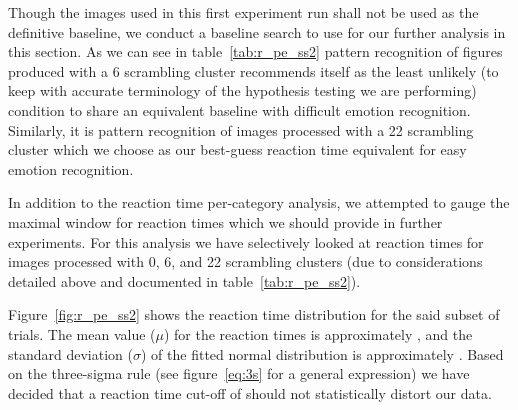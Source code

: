 	    Though the images used in this first experiment run shall not be used as the definitive baseline, we conduct a baseline search to use for our further analysis in this section.
	    As we can see in table~\ref{tab:r_pe_ss2} pattern recognition of figures produced with a \SI{6}{\pixel} scrambling cluster recommends itself as the least unlikely (to keep with accurate terminology of the hypothesis testing we are performing) condition to share an equivalent baseline with difficult emotion recognition.
	    Similarly, it is pattern recognition of images processed with a \SI{22}{\pixel} scrambling cluster which we choose as our best-guess reaction time equivalent for easy emotion recognition.
	    
	    In addition to the reaction time per-category analysis, we attempted to gauge the maximal window for reaction times which we should provide in further experiments.
	    For this analysis we have selectively looked at reaction times for images processed with \SI{0}{\pixel}, \SI{6}{\pixel}, and \SI{22}{\pixel} scrambling clusters (due to considerations detailed above and documented in table~\ref{tab:r_pe_ss2}).
	    
	    Figure~\ref{fig:r_pe_ss2} shows the reaction time distribution for the said subset of trials.
	    The mean value ($\mu$) for the reaction times is approximately , 
	    and the standard deviation ($\sigma$) of the fitted normal distribution is approximately .
	    Based on the three-sigma rule (see figure~\ref{eq:3s} for a general expression) we have decided that a reaction time cut-off of  should not statistically distort our data.
	    
